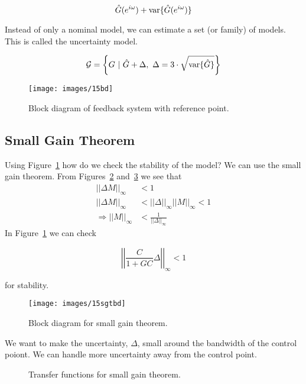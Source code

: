 \begin{equation*}
\hat{G}(e^{i\omega}) + \text{var}\{\hat{G}(e^{i\omega})\}
\end{equation*}

Instead of only a nominal model, we can estimate a set (or family) of models.
This is called the uncertainty model.

\begin{equation*}
\mathcal{G} = \left\lbrace G~|~\hat{G}+\Delta,~\Delta=3\cdot\sqrt{\text{var}\{\hat{G}\}}\right\rbrace
\end{equation*}

\begin{figure}[ht!]
\centering
\texttt{[image: images/15bd]}
\caption{Block diagram of feedback system with reference point.}%
\label{fig:15bd}
\end{figure}

\subsection{Small Gain Theorem}%
\label{sec:15sgt}
Using Figure~\ref{fig:15bd} how do we check the stability of the model? We can use the small gain theorem.
From Figures~\ref{fig:15sgtbd} and~\ref{fig:15sgt} we see that
\begin{align*}
||\Delta M||_\infty &< 1 \\
||\Delta M||_\infty &< ||\Delta||_\infty||M||_\infty < 1 \\
\Rightarrow ||M||_\infty &< \frac{1}{||\Delta||_\infty}
\end{align*}
In Figure~\ref{fig:15bd} we can check

\begin{equation*}
\left|\left|\frac{C}{1+GC}\Delta\right|\right|_\infty < 1
\end{equation*}

for stability.

\begin{figure}[ht!]
\centering
\texttt{[image: images/15sgtbd]}
\caption{Block diagram for small gain theorem.}%
\label{fig:15sgtbd}
\end{figure}

We want to make the uncertainty, $\Delta$, small around the bandwidth of the control poiont. We can handle more uncertainty away from the control point.

\begin{figure}[ht!]
\centering
{} \hfill
{}
\caption{Transfer functions for small gain theorem.}%
\label{fig:15sgt}
\end{figure}
